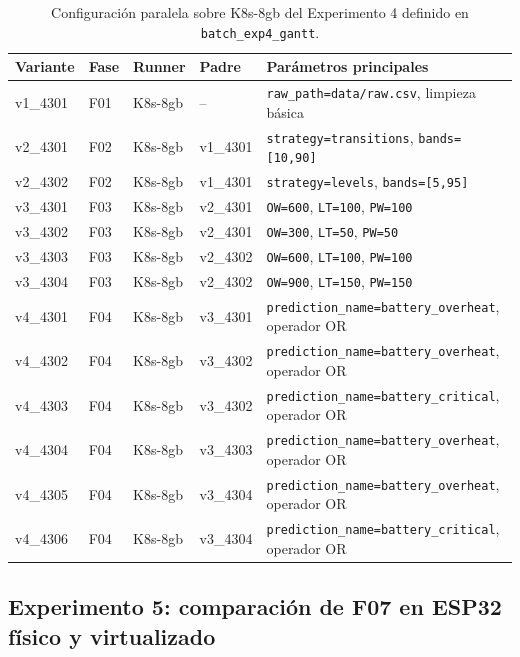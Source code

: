 \begin{table}[htbp]
    \centering
    \caption{Configuración paralela sobre K8s-8gb del Experimento 4 definido en \texttt{batch\_exp4\_gantt}.}
    \label{tab:params-exp4-gantt-k8s}
    \begin{tabular}{p{}p{}p{}p{}p{}}
        \hline
        \textbf{Variante} & \textbf{Fase} & \textbf{Runner} & \textbf{Padre} & \textbf{Parámetros principales} \\
        \hline
        v1\_4301 & F01 & K8s-8gb & -- & \texttt{raw\_path=data/raw.csv}, limpieza básica \\
        v2\_4301 & F02 & K8s-8gb & v1\_4301 & \texttt{strategy=transitions}, \texttt{bands=[10,90]} \\
        v2\_4302 & F02 & K8s-8gb & v1\_4301 & \texttt{strategy=levels}, \texttt{bands=[5,95]} \\
        v3\_4301 & F03 & K8s-8gb & v2\_4301 & \texttt{OW=600}, \texttt{LT=100}, \texttt{PW=100} \\
        v3\_4302 & F03 & K8s-8gb & v2\_4301 & \texttt{OW=300}, \texttt{LT=50}, \texttt{PW=50} \\
        v3\_4303 & F03 & K8s-8gb & v2\_4302 & \texttt{OW=600}, \texttt{LT=100}, \texttt{PW=100} \\
        v3\_4304 & F03 & K8s-8gb & v2\_4302 & \texttt{OW=900}, \texttt{LT=150}, \texttt{PW=150} \\
        v4\_4301 & F04 & K8s-8gb & v3\_4301 & \texttt{prediction\_name=battery\_overheat}, operador OR \\
        v4\_4302 & F04 & K8s-8gb & v3\_4302 & \texttt{prediction\_name=battery\_overheat}, operador OR \\
        v4\_4303 & F04 & K8s-8gb & v3\_4302 & \texttt{prediction\_name=battery\_critical}, operador OR \\
        v4\_4304 & F04 & K8s-8gb & v3\_4303 & \texttt{prediction\_name=battery\_overheat}, operador OR \\
        v4\_4305 & F04 & K8s-8gb & v3\_4304 & \texttt{prediction\_name=battery\_overheat}, operador OR \\
        v4\_4306 & F04 & K8s-8gb & v3\_4304 & \texttt{prediction\_name=battery\_critical}, operador OR \\
        \hline
    \end{tabular}
\end{table}

\subsection{Experimento 5: comparación de F07 en ESP32 físico y virtualizado}
\label{anexo:exp5-comparacion-f07}

